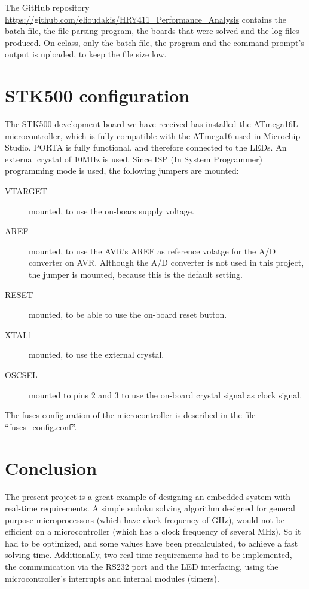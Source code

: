 \documentclass[12pt, a4, hidelinks]{article}
\begin{document}
\noindent The GitHub repository \url{https://github.com/elioudakis/HRY411_Performance_Analysis} contains the batch file, the file parsing program, the boards that were solved and the log files produced. On eclass, only the batch file, the program and the command prompt's output is uploaded, to keep the file size low.

\section*{STK500 configuration}
The STK500 development board we have received has installed the ATmega16L microcontroller, which is fully compatible with the ATmega16 used in Microchip Studio. PORTA is fully functional, and therefore connected to the LEDs. An external crystal of 10MHz is used. Since ISP (In System Programmer) programming mode is used, the following jumpers are mounted:
\begin{description}
\item[VTARGET] mounted, to use the on-boars supply voltage.
\item[AREF] mounted, to use the AVR's AREF as reference volatge for the A/D converter on AVR. Although the A/D converter is not used in this project, the jumper is mounted, because this is the default setting.
\item[RESET] mounted, to be able to use the on-board reset button.
\item[XTAL1] mounted, to use the external crystal.
\item[OSCSEL] mounted to pins 2 and 3 to use the on-board crystal signal as clock signal.
\end{description}
The fuses configuration of the microcontroller is described in the file ``fuses\_config.conf''.

\section*{Conclusion}
The present project is a great example of designing an embedded system with real-time requirements. A simple sudoku solving algorithm designed for general purpose microprocessors (which have clock frequency of GHz), would not be efficient on a microcontroller (which has a clock frequency of several MHz). So it had to be optimized, and some values have been precalculated, to achieve a fast solving time. Additionally, two real-time requirements had to be implemented, the communication via the RS232 port and the LED interfacing, using the microcontroller's interrupts and internal modules (timers).
\end{document}
